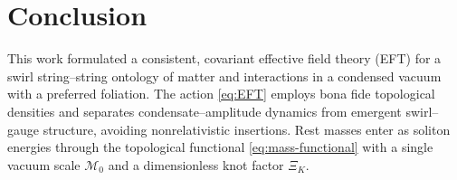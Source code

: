 \documentclass[11pt, preprint,titlepage]{revtex4-2}
\begin{document}
    

    

    

    

    

    

    \section{Conclusion}

    This work formulated a consistent, covariant effective field theory (EFT) for a swirl string–string ontology of matter and interactions in a condensed vacuum with a preferred foliation. The action \eqref{eq:EFT} employs bona fide topological densities and separates condensate–amplitude dynamics from emergent swirl–gauge structure, avoiding nonrelativistic insertions. Rest masses enter as soliton energies through the topological functional \eqref{eq:mass-functional} with a single vacuum scale \(\mathcal{M}_0\) and a dimensionless knot factor \(\Xi_K\).
\end{document}
